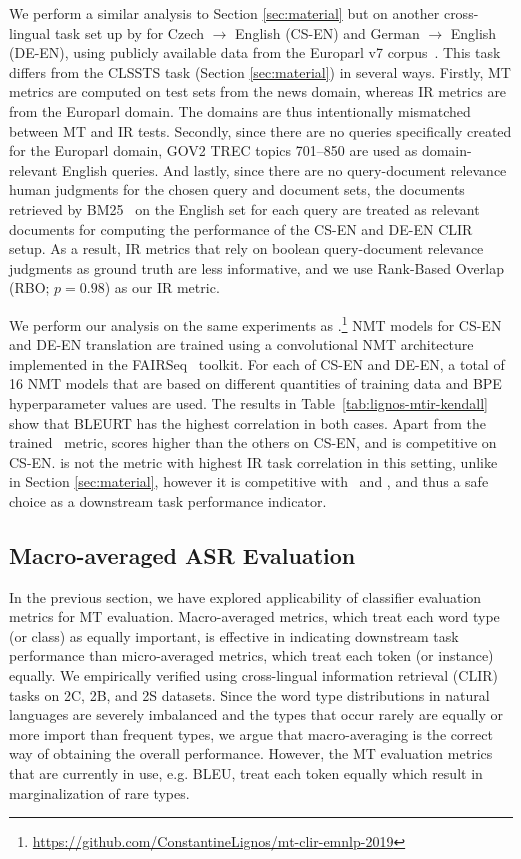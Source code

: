We perform a similar analysis to Section \ref{sec:material} but on another cross-lingual task set up by \citet{lignos-etal-2019-MT-IR} for Czech $\rightarrow$ English (CS-EN) and German $\rightarrow$ English (DE-EN), using publicly available data from the Europarl v7 corpus~\cite{koehn2005europarl}. 
This task differs from the CLSSTS task (Section \ref{sec:material}) in several ways.
Firstly, MT metrics are computed on test sets from the news domain, whereas IR metrics are from the Europarl domain. The domains are thus intentionally mismatched between MT and IR tests.
Secondly, since there are no queries specifically created for the Europarl domain, GOV2 TREC topics 701–850 are used as domain-relevant English queries.
And lastly, since there are no query-document relevance human judgments for the chosen query and document sets, the documents retrieved by BM25~\cite{jones2000probabilistic} on the English set for each query are treated as relevant documents for computing the performance of the CS-EN and DE-EN CLIR setup. 
As a result, IR metrics that rely on boolean query-document relevance judgments as ground truth are less informative, and we use Rank-Based Overlap (RBO; $p=0.98$) \cite{webber2010RBO} as our IR metric.

We perform our analysis on the same experiments as \citet{lignos-etal-2019-MT-IR}.\footnote{\url{https://github.com/ConstantineLignos/mt-clir-emnlp-2019}}
NMT models for CS-EN and DE-EN translation are trained using a convolutional NMT architecture \cite{gehring2017CNNMT} implemented in the FAIRSeq~\cite{ott-etal-2019-fairseq} toolkit.
For each of CS-EN and DE-EN, a total of 16 NMT models that are based on different quantities of training data and BPE hyperparameter values are used.
The results in Table~\ref{tab:lignos-mtir-kendall} show that BLEURT has the highest correlation in both cases.
Apart from the trained \blrtmd\ metric,  scores higher than the others on CS-EN, and is competitive on CS-EN.  is not the metric with highest IR task correlation in this setting, unlike in Section \ref{sec:material}, however it is competitive with \bleu\ and , and thus a safe choice as a downstream task performance indicator. 


\subsection{Macro-averaged ASR Evaluation}
In the previous section, we have explored applicability of classifier evaluation metrics for MT evaluation. Macro-averaged metrics, which treat each word type (or class) as equally important, is effective in indicating downstream task performance than micro-averaged metrics, which treat each token (or instance) equally. We empirically verified using cross-lingual information retrieval (CLIR) tasks on 2C, 2B, and 2S datasets. Since the word type distributions in natural languages are severely imbalanced and the types that occur rarely are equally or more import than frequent types, we argue that macro-averaging is the correct way of obtaining the overall performance. However, the MT evaluation metrics that are currently in use, e.g. BLEU, treat each token equally which result in marginalization of rare types.

